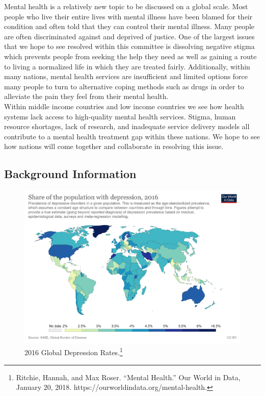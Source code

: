 \documentclass[10pt, letterpaper]{article}
\begin{document}
Mental health is a relatively new topic to be discussed on a global
scale. Most people who live their entire lives with mental illness have
been blamed for their condition and often told that they can control
their mental illness. Many people are often discriminated against and
deprived of justice. One of the largest issues that we hope to see
resolved within this committee is dissolving negative stigma which
prevents people from seeking the help they need as well as gaining a
route to living a normalized life in which they are treated fairly.
Additionally, within many nations, mental health services are
insufficient and limited options force many people to turn to
alternative coping methods such as drugs in order to alleviate the pain
they feel from their mental health. \\

Within middle income countries and low income countries we see how
health systems lack access to high-quality mental health services.
Stigma, human resource shortages, lack of research, and inadequate
service delivery models all contribute to a mental health treatment gap
within these nations. We hope to see how nations will come together and
collaborate in resolving this issue. \\

\subsection{Background Information}

  \begin{figure}
\centering
    \includegraphics[scale= 0.1]{image2.png}
    \caption{2016 Global Depression Rates.\footnote{Ritchie,
  Hannah, and Max Roser. ``Mental Health.'' Our World in Data, January
  20, 2018. https://ourworldindata.org/mental-health.}}
\end{figure} 
\end{document}

